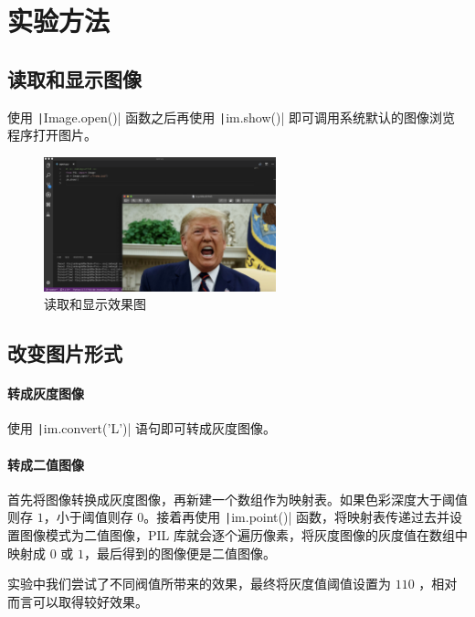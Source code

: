 \documentclass[11pt]{ctexart}
\begin{document}
\section{实验方法}

\subsection{读取和显示图像}

使用 \texttt|Image.open()| 函数之后再使用  \texttt|im.show()| 即可调用系统默认的图像浏览程序打开图片。

  \begin{figure}[htbp]
        \centering
        \includegraphics[width=0.6\textwidth]{./pic1.png}
        \caption{读取和显示效果图}\label{fig:digit}
  \end{figure}

\subsection{改变图片形式}

\paragraph{转成灰度图像}

使用 \texttt|im.convert('L')| 语句即可转成灰度图像。

\paragraph{转成二值图像}

首先将图像转换成灰度图像，再新建一个数组作为映射表。如果色彩深度大于阈值则存 $1$，小于阈值则存 $0$。接着再使用 \texttt|im.point()| 函数，将映射表传递过去并设置图像模式为二值图像，PIL 库就会逐个遍历像素，将灰度图像的灰度值在数组中映射成 $0$ 或 $1$，最后得到的图像便是二值图像。

实验中我们尝试了不同阀值所带来的效果，最终将灰度值阈值设置为 $110$ ，相对而言可以取得较好效果。
\end{document}

